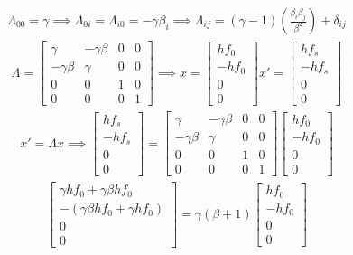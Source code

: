 \documentclass{article}
\begin{document}
\begin{gather*}
\Lambda_{00} = \gamma \implies \Lambda_{0i} = \Lambda_{i0} = -\gamma\beta_i \implies 	\Lambda_{ij} = (\gamma - 1)\left(\frac{\beta_i\beta_j}{\beta^2}\right) + \delta_{ij}
\end{gather*}
\begin{gather*}
\Lambda = \begin{bmatrix} \gamma & -\gamma\beta & 0 & 0 \\
	-\gamma\beta & \gamma & 0 & 0 \\
	0 & 0 & 1 & 0 \\
	0 & 0 & 0 & 1
\end{bmatrix} \implies 	x = \begin{bmatrix} hf_0 \\ -hf_0 \\ 0 \\ 0
\end{bmatrix} x' = \begin{bmatrix} hf_s \\ -hf_s \\ 0 \\ 0 \end{bmatrix}
\end{gather*}
\begin{gather*}
x' = \Lambda x \implies  \begin{bmatrix} hf_s \\ -hf_s \\ 0 \\ 0 \end{bmatrix} = \begin{bmatrix} \gamma & -\gamma\beta & 0 & 0 \\
	-\gamma\beta & \gamma & 0 & 0 \\
	0 & 0 & 1 & 0 \\
	0 & 0 & 0 & 1
\end{bmatrix} \begin{bmatrix} hf_0 \\ -hf_0 \\ 0 \\ 0
\end{bmatrix} 
\end{gather*}
\begin{gather*}
\begin{bmatrix} \gamma h f_0 + \gamma\beta h f_0 \\ -(\gamma\beta hf_0 + \gamma h f_0) \\ 0 \\ 0\end{bmatrix} = \gamma(\beta + 1) \begin{bmatrix} hf_0 \\ -hf_0 \\ 0 \\ 0 \end{bmatrix}
\end{gather*}
\end{document}
